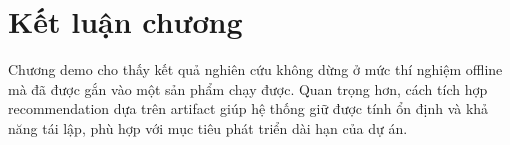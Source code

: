 \section{Kết luận chương}
Chương demo cho thấy kết quả nghiên cứu không dừng ở mức thí nghiệm offline mà đã được gắn vào một sản phẩm chạy được. Quan trọng hơn, cách tích hợp recommendation dựa trên artifact giúp hệ thống giữ được tính ổn định và khả năng tái lập, phù hợp với mục tiêu phát triển dài hạn của dự án.
